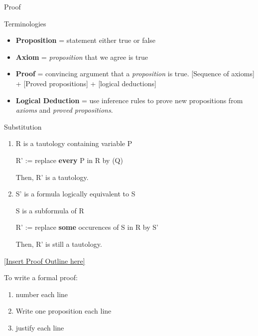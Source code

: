\documentclass{alittlebear}
\begin{document}
\begin{unit}{Proof}{}
    \begin{mathnote}{Terminologies}
    \begin{itemize}
        \item \textbf{Proposition} = statement either true or false
        \item \textbf{Axiom} = \textit{proposition} that we agree is true
        \item \textbf{Proof} = convincing argument that a \textit{proposition} is true. [Sequence of axioms] + [Proved propositions] + [logical deductions]
        \item \textbf{Logical Deduction} = use inference rules to prove new propositions from \textit{axioms} and \textit{proved propositions}.
    \end{itemize}
    \qbreak
        \begin{mathnote}{Substitution}
            \begin{enumerate}
                \item R is a tautology containing variable P

                        R' := replace \textbf{every} P in R by (Q)
            
                        Then, R' is a tautology.
                \item S' is a formula logically equivalent to S

                S is a subformula of R

                R' := replace \textbf{some} occurences of S in R by S'

                Then, R' is still a tautology.
            \end{enumerate}
        \end{mathnote}

        \begin{mathnote}
            \hyperlink{https://q.utoronto.ca/courses/337079/files/29579125?wrap=1}{[Insert Proof Outline here]}
        \end{mathnote}
        
    \end{mathnote}
    \begin{note}
        To write a formal proof:
        \begin{enumerate}
            \item number each line
            \item  Write one proposition each line
            \item  justify each line
        \end{enumerate}
    \end{note}
    \begin{hint}{\hfill}
        
    \end{hint}
\end{unit}
\end{document}
